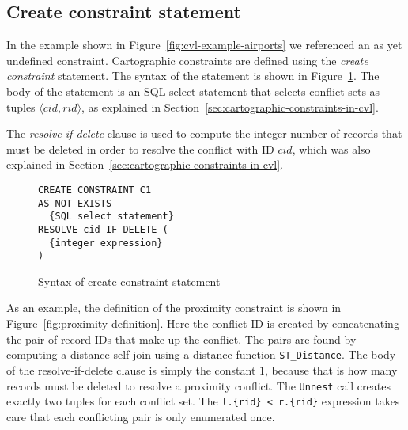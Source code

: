 


\subsection{Create constraint statement}
\label{sec:create-constraint-statement}

In the example shown in Figure~\ref{fig:cvl-example-airports} we referenced an as yet undefined constraint. Cartographic constraints are defined using the \emph{create constraint} statement.  The syntax of the statement is shown in Figure~\ref{fig:create-constraint-syntax}. The body of the statement is an SQL select statement that selects conflict sets as tuples $\langle cid, rid\rangle$, as explained in Section~\ref{sec:cartographic-constraints-in-cvl}.

The \emph{resolve-if-delete} clause is used to compute the integer number of records that must be deleted in order to resolve the conflict with ID $cid$, which was also explained in Section~\ref{sec:cartographic-constraints-in-cvl}.

\begin{figure}[htbp]
\begin{center}
\begin{lstlisting}
CREATE CONSTRAINT C1
AS NOT EXISTS
  {SQL select statement}
RESOLVE cid IF DELETE (
  {integer expression}
)
\end{lstlisting}
\caption{Syntax of create constraint statement}
\label{fig:create-constraint-syntax}
\end{center}
\end{figure}

As an example, the definition of the proximity constraint is shown in Figure~\ref{fig:proximity-definition}. Here the conflict ID is created by concatenating the pair of record IDs that make up the conflict. The pairs are found by computing a distance self join using a distance function \texttt{ST\_Distance}. The body of the resolve-if-delete clause is simply the constant $1$, because that is how many records must be deleted to resolve a proximity conflict. The \texttt{Unnest} call creates exactly two tuples for each conflict set. The \texttt{l.\{rid\} < r.\{rid\}} expression takes care that each conflicting pair is only enumerated once.

